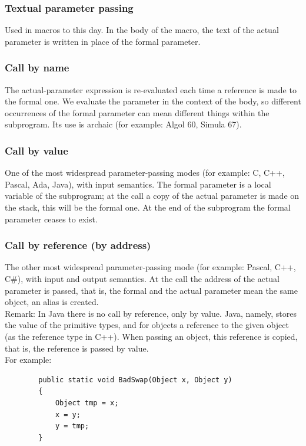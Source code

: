 \documentclass[margin=0px]{article}
\begin{document}
\subsubsection{Textual parameter passing}

Used in macros to this day. In the body of the macro, the text of the actual parameter is written in place of the formal parameter.

\subsubsection{Call by name}

The actual-parameter expression is re-evaluated each time a reference is made to the formal one. We evaluate the parameter in the context of the body, so different occurrences of the formal parameter can mean different things within the subprogram.
Its use is archaic (for example: Algol 60, Simula 67).

\subsubsection{Call by value}

One of the most widespread parameter-passing modes (for example: C, C++, Pascal, Ada, Java), with input semantics. The formal parameter is a local variable of the subprogram; at the call a copy of the actual parameter is made on the stack, this will be the formal one. At the end of the subprogram the formal parameter ceases to exist.

\subsubsection{Call by reference (by address)}

The other most widespread parameter-passing mode (for example: Pascal, C++, C\#), with input and output semantics. At the call the address of the actual parameter is passed, that is, the formal and the actual parameter mean the same object, an alias is created.\\

Remark: In Java there is no call by reference, only by value. Java, namely, stores the value of the primitive types,
and for objects a reference to the given object (as the reference type in C++). When passing an object, this reference is copied, that is, the reference is passed by value.\\

\noindent	For example:
\begin{verbatim}
        public static void BadSwap(Object x, Object y)
        {
            Object tmp = x;
            x = y;
            y = tmp;
        }
\end{verbatim}
\end{document}
